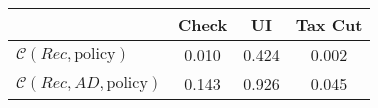 \begin{tabular}{@{}lccc@{}} 
\toprule 
                          & Check      & UI    & Tax Cut    \\  \midrule 
$\mathcal{C}(Rec,\text{policy})$ & 0.010  & 0.424  & 0.002     \\ 
$\mathcal{C}(Rec, AD,\text{policy})$ & 0.143  & 0.926  & 0.045     \\ 
\end{tabular}  

